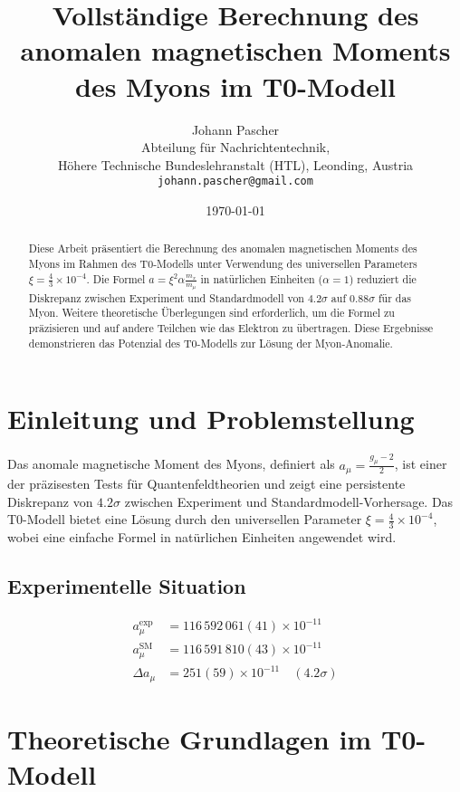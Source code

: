 \documentclass[12pt,a4paper]{article}
\title{Vollständige Berechnung des anomalen magnetischen Moments des Myons im T0-Modell}
\author{Johann Pascher\\
	Abteilung für Nachrichtentechnik, \\Höhere Technische Bundeslehranstalt (HTL), Leonding, Austria\\
	\texttt{johann.pascher@gmail.com}}
\date{\today}
\newcommand{\xipar}{\xi}
\begin{document}
	
	\maketitle
	
	\begin{abstract}
		Diese Arbeit präsentiert die Berechnung des anomalen magnetischen Moments des Myons im Rahmen des T0-Modells unter Verwendung des universellen Parameters \(\xipar = \frac{4}{3} \times 10^{-4}\). Die Formel \(a = \xipar^2 \alpha \frac{m_x}{m_\mu}\) in natürlichen Einheiten (\(\alpha = 1\)) reduziert die Diskrepanz zwischen Experiment und Standardmodell von \(4.2\sigma\) auf \(0.88\sigma\) für das Myon. Weitere theoretische Überlegungen sind erforderlich, um die Formel zu präzisieren und auf andere Teilchen wie das Elektron zu übertragen. Diese Ergebnisse demonstrieren das Potenzial des T0-Modells zur Lösung der Myon-Anomalie.
	\end{abstract}
	
	\tableofcontents
	\newpage
	
	\section{Einleitung und Problemstellung}
	
	Das anomale magnetische Moment des Myons, definiert als \(a_\mu = \frac{g_\mu - 2}{2}\), ist einer der präzisesten Tests für Quantenfeldtheorien und zeigt eine persistente Diskrepanz von \(4.2\sigma\) zwischen Experiment und Standardmodell-Vorhersage. Das T0-Modell bietet eine Lösung durch den universellen Parameter \(\xipar = \frac{4}{3} \times 10^{-4}\), wobei eine einfache Formel in natürlichen Einheiten angewendet wird.
	
	\subsection{Experimentelle Situation}
	
	\begin{align}
		a_\mu^{\text{exp}} &= 116\,592\,061(41) \times 10^{-11} \label{eq:exp} \\
		a_\mu^{\text{SM}} &= 116\,591\,810(43) \times 10^{-11} \label{eq:sm} \\
		\Delta a_\mu &= 251(59) \times 10^{-11} \quad (4.2\sigma) \label{eq:disc}
	\end{align}
	
	\section{Theoretische Grundlagen im T0-Modell}
	
\end{document}
